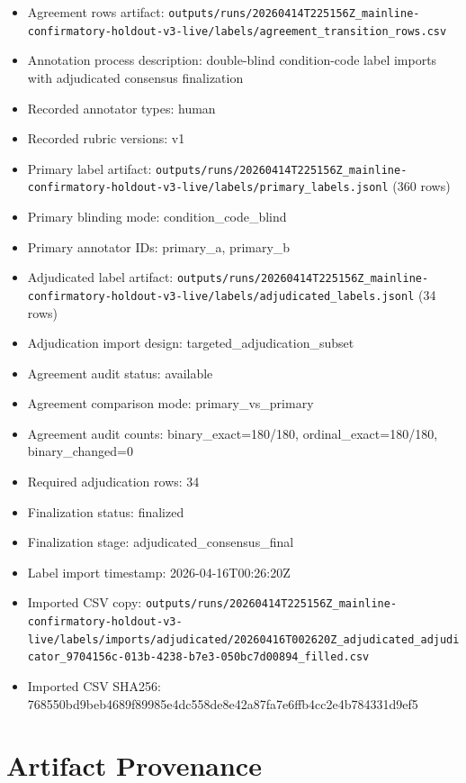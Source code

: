 \documentclass{article}
\providecommand{\tightlist}{%
  \setlength{\itemsep}{0pt}\setlength{\parskip}{0pt}}
\begin{document}
\begin{itemize}
\tightlist
\item
  Agreement rows artifact: \texttt{outputs/runs/20260414T225156Z\_mainline-confirmatory-holdout-v3-live/labels/agreement\_transition\_rows.csv}
\item
  Annotation process description: double-blind condition-code label imports with adjudicated consensus finalization
\item
  Recorded annotator types: human
\item
  Recorded rubric versions: v1
\item
  Primary label artifact: \texttt{outputs/runs/20260414T225156Z\_mainline-confirmatory-holdout-v3-live/labels/primary\_labels.jsonl} (360 rows)
\item
  Primary blinding mode: condition\_code\_blind
\item
  Primary annotator IDs: primary\_a, primary\_b
\item
  Adjudicated label artifact: \texttt{outputs/runs/20260414T225156Z\_mainline-confirmatory-holdout-v3-live/labels/adjudicated\_labels.jsonl} (34 rows)
\item
  Adjudication import design: targeted\_adjudication\_subset
\item
  Agreement audit status: available
\item
  Agreement comparison mode: primary\_vs\_primary
\item
  Agreement audit counts: binary\_exact=180/180, ordinal\_exact=180/180, binary\_changed=0
\item
  Required adjudication rows: 34
\item
  Finalization status: finalized
\item
  Finalization stage: adjudicated\_consensus\_final
\item
  Label import timestamp: 2026-04-16T00:26:20Z
\item
  Imported CSV copy: \texttt{outputs/runs/20260414T225156Z\_mainline-confirmatory-holdout-v3-live/labels/imports/adjudicated/20260416T002620Z\_adjudicated\_adjudicator\_9704156c-013b-4238-b7e3-050bc7d00894\_filled.csv}
\item
  Imported CSV SHA256: 768550bd9beb4689f89985e4dc558de8e42a87fa7e6ffb4cc2e4b784331d9ef5
\end{itemize}

\section{Artifact Provenance}\label{artifact-provenance}
\end{document}
